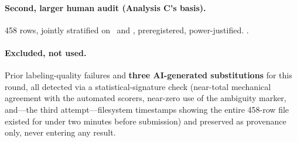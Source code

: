 \paragraph{Second, larger human audit (Analysis C's basis).} 458 rows,
jointly stratified on \scoreboxed\ and \exactmatch, preregistered,
power-justified. .

\paragraph{Excluded, not used.} Prior labeling-quality failures and
\textbf{three AI-generated substitutions} for this round, all detected via
a statistical-signature check (near-total mechanical agreement with the
automated scorers, near-zero use of the ambiguity marker, and---the third
attempt---filesystem timestamps showing the entire 458-row file existed for
under two minutes before submission) and preserved as provenance only,
never entering any result.
